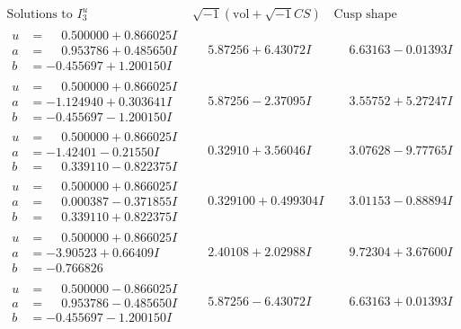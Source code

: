 \documentclass[1p]{elsarticle_modified}
\theoremstyle{definition}
\newcommand{\I}{\sqrt{-1}}
\begin{document}
$$\begin{array}{c|c|c}  
\text{Solutions to }I^u_{3}& \I (\text{vol} + \sqrt{-1}CS) & \text{Cusp shape}\\
 \hline 
\begin{aligned}
u &= \phantom{-}0.500000 + 0.866025 I \\
a &= \phantom{-}0.953786 + 0.485650 I \\
b &= -0.455697 + 1.200150 I\end{aligned}
 & \phantom{-}5.87256 + 6.43072 I & \phantom{-}6.63163 - 0.01393 I \\ \hline\begin{aligned}
u &= \phantom{-}0.500000 + 0.866025 I \\
a &= -1.124940 + 0.303641 I \\
b &= -0.455697 - 1.200150 I\end{aligned}
 & \phantom{-}5.87256 - 2.37095 I & \phantom{-}3.55752 + 5.27247 I \\ \hline\begin{aligned}
u &= \phantom{-}0.500000 + 0.866025 I \\
a &= -1.42401 - 0.21550 I \\
b &= \phantom{-}0.339110 - 0.822375 I\end{aligned}
 & \phantom{-}0.32910 + 3.56046 I & \phantom{-}3.07628 - 9.77765 I \\ \hline\begin{aligned}
u &= \phantom{-}0.500000 + 0.866025 I \\
a &= \phantom{-}0.000387 - 0.371855 I \\
b &= \phantom{-}0.339110 + 0.822375 I\end{aligned}
 & \phantom{-}0.329100 + 0.499304 I & \phantom{-}3.01153 - 0.88894 I \\ \hline\begin{aligned}
u &= \phantom{-}0.500000 + 0.866025 I \\
a &= -3.90523 + 0.66409 I \\
b &= -0.766826\phantom{ +0.000000I}\end{aligned}
 & \phantom{-}2.40108 + 2.02988 I & \phantom{-}9.72304 + 3.67600 I \\ \hline\begin{aligned}
u &= \phantom{-}0.500000 - 0.866025 I \\
a &= \phantom{-}0.953786 - 0.485650 I \\
b &= -0.455697 - 1.200150 I\end{aligned}
 & \phantom{-}5.87256 - 6.43072 I & \phantom{-}6.63163 + 0.01393 I \\ \hline\begin{aligned}

\end{aligned}
\end{array}$$
\end{document}
